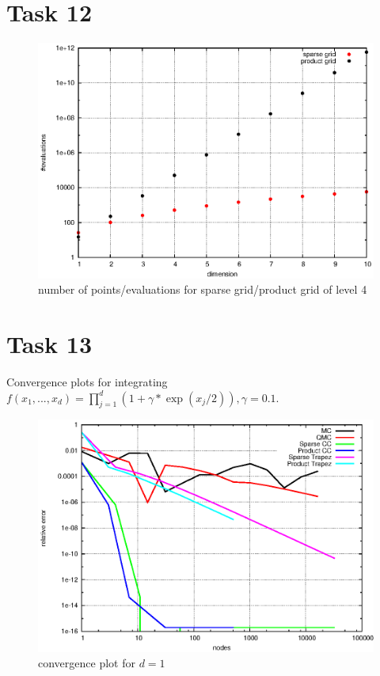 \documentclass[]{article}
\begin{document}
\section*{Task 12}
\begin{figure}[!ht]
\centering
\includegraphics[width=.9\textwidth]{task12}
\caption{number of points/evaluations for sparse grid/product grid of level 4}
\label{fig:Task12}
\end{figure}


\section*{Task 13}
Convergence plots for integrating $f(x_1,...,x_d)=\prod_{j=1}^d (1+\gamma*\exp(x_j/2)),\gamma=0.1$.\\
\begin{figure}[!ht]
\centering
\includegraphics[width=.9\textwidth]{task13_d1}
\caption{convergence plot for $d=1$}
\label{fig:Task13a}
\end{figure}
\end{document}

